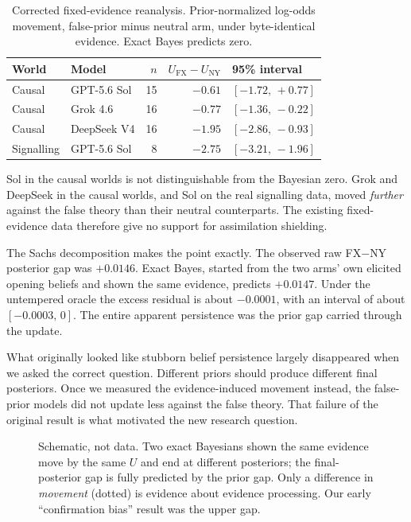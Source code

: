\documentclass[10pt,letterpaper,twocolumn]{article}
\begin{document}
\begin{table}[t]
\centering\small
\caption{Corrected fixed-evidence reanalysis. Prior-normalized log-odds movement, false-prior minus neutral arm, under byte-identical evidence. Exact Bayes predicts zero.}
\label{tab:reanalysis}
\setlength{\tabcolsep}{3.5pt}
\begin{tabular}{@{}llrrl@{}}
\toprule
World & Model & $n$ & $U_{\mathrm{FX}}\!-\!U_{\mathrm{NY}}$ & 95\% interval \\
\midrule
Causal & GPT-5.6 Sol & 15 & $-0.61$ & $[-1.72,\,+0.77]$ \\
Causal & Grok 4.6 & 16 & $-0.77$ & $[-1.36,\,-0.22]$ \\
Causal & DeepSeek V4 & 16 & $-1.95$ & $[-2.86,\,-0.93]$ \\
Signalling & GPT-5.6 Sol & 8 & $-2.75$ & $[-3.21,\,-1.96]$ \\
\bottomrule
\end{tabular}
\end{table}

Sol in the causal worlds is not distinguishable from the Bayesian zero. Grok and DeepSeek in the causal worlds, and Sol on the real signalling data, moved \emph{further} against the false theory than their neutral counterparts. The existing fixed-evidence data therefore give no support for assimilation shielding.

The Sachs decomposition makes the point exactly. The observed raw FX$-$NY posterior gap was $+0.0146$. Exact Bayes, started from the two arms' own elicited opening beliefs and shown the same evidence, predicts $+0.0147$. Under the untempered oracle the excess residual is about $-0.0001$, with an interval of about $[-0.0003,\,0]$. The entire apparent persistence was the prior gap carried through the update.

What originally looked like stubborn belief persistence largely disappeared when we asked the correct question. Different priors should produce different final posteriors. Once we measured the evidence-induced movement instead, the false-prior models did not update less against the false theory. That failure of the original result is what motivated the new research question.

\begin{figure}[t]
\centering

\caption{Schematic, not data. Two exact Bayesians shown the same evidence move by the same $U$ and end at different posteriors; the final-posterior gap is fully predicted by the prior gap. Only a difference in \emph{movement} (dotted) is evidence about evidence processing. Our early ``confirmation bias'' result was the upper gap.}
\label{fig:logodds}
\end{figure}
\end{document}
